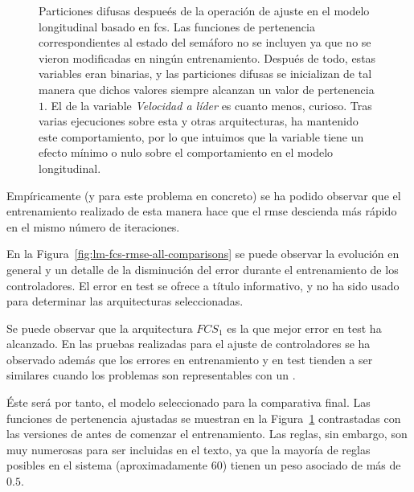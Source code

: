 \begin{figure}[t]
	\centering
	\qquad
	\qquad
	\qquad
	\caption[Particiones difusas después de la operación de ajuste en el modelo longitudinal basado en \acrshort{fcs}]{Particiones difusas despueés de la operación de ajuste en el modelo longitudinal basado en \ac{fcs}. Las funciones de pertenencia correspondientes al estado del semáforo no se incluyen ya que no se vieron modificadas en ningún entrenamiento. Después de todo, estas variables eran binarias, y las particiones difusas se inicializan de tal manera que dichos valores siempre alcanzan un valor de pertenencia $1$. El de la variable \textit{Velocidad a líder} es cuanto menos, curioso. Tras varias ejecuciones sobre esta y otras arquitecturas, ha mantenido este comportamiento, por lo que intuimos que la variable tiene un efecto mínimo o nulo sobre el comportamiento en el modelo longitudinal.}
	\label{fig:adjusted-fuzzy-partitions}
\end{figure}

Empíricamente (y para este problema en concreto) se ha podido observar que el entrenamiento realizado de esta manera hace que el \ac{rmse} descienda más rápido en el mismo número de iteraciones.

En la Figura~\ref{fig:lm-fcs-rmse-all-comparisons} se puede observar la evolución en general y un detalle de la disminución del error durante el entrenamiento de los controladores. El error en test se ofrece a título informativo, y no ha sido usado para determinar las arquitecturas seleccionadas.

Se puede observar que la arquitectura $FCS_1$ es la que mejor error en test ha alcanzado. En las pruebas realizadas para el ajuste de controladores se ha observado además que los errores en entrenamiento y en test tienden a ser similares cuando los problemas son representables con un .

Éste será por tanto, el modelo seleccionado para la comparativa final. Las funciones de pertenencia ajustadas se muestran en la Figura~\ref{fig:adjusted-fuzzy-partitions} contrastadas con las versiones de antes de comenzar el entrenamiento. Las reglas, sin embargo, son muy numerosas para ser incluidas en el texto, ya que la mayoría de reglas posibles en el sistema (aproximadamente $60$) tienen un peso asociado de más de $0.5$.

